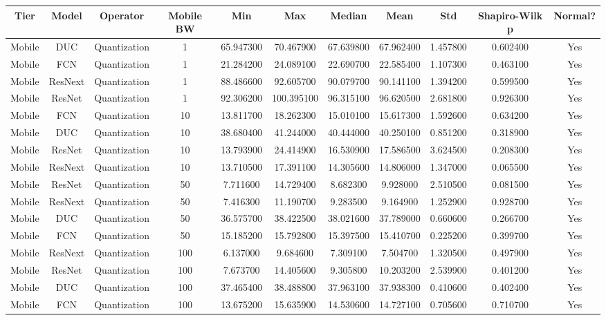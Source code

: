 \begin{tabular}{|c||c||c||c||c||c||c||c||c||c||c|}
\toprule
Tier & Model & Operator & Mobile BW & Min & Max & Median & Mean & Std & Shapiro-Wilk p & Normal? \\
\midrule
Mobile & DUC & Quantization & 1 & 65.947300 & 70.467900 & 67.639800 & 67.962400 & 1.457800 & 0.602400 & Yes \\
Mobile & FCN & Quantization & 1 & 21.284200 & 24.089100 & 22.690700 & 22.585400 & 1.107300 & 0.463100 & Yes \\
Mobile & ResNext & Quantization & 1 & 88.486600 & 92.605700 & 90.079700 & 90.141100 & 1.394200 & 0.599500 & Yes \\
Mobile & ResNet & Quantization & 1 & 92.306200 & 100.395100 & 96.315100 & 96.620500 & 2.681800 & 0.926300 & Yes \\
Mobile & FCN & Quantization & 10 & 13.811700 & 18.262300 & 15.010100 & 15.617300 & 1.592600 & 0.634200 & Yes \\
Mobile & DUC & Quantization & 10 & 38.680400 & 41.244000 & 40.444000 & 40.250100 & 0.851200 & 0.318900 & Yes \\
Mobile & ResNet & Quantization & 10 & 13.793900 & 24.414900 & 16.530900 & 17.586500 & 3.624500 & 0.208300 & Yes \\
Mobile & ResNext & Quantization & 10 & 13.710500 & 17.391100 & 14.305600 & 14.806000 & 1.347000 & 0.065500 & Yes \\
Mobile & ResNet & Quantization & 50 & 7.711600 & 14.729400 & 8.682300 & 9.928000 & 2.510500 & 0.081500 & Yes \\
Mobile & ResNext & Quantization & 50 & 7.416300 & 11.190700 & 9.283500 & 9.164900 & 1.252900 & 0.928700 & Yes \\
Mobile & DUC & Quantization & 50 & 36.575700 & 38.422500 & 38.021600 & 37.789000 & 0.660600 & 0.266700 & Yes \\
Mobile & FCN & Quantization & 50 & 15.185200 & 15.792800 & 15.397500 & 15.410700 & 0.225200 & 0.399700 & Yes \\
Mobile & ResNext & Quantization & 100 & 6.137000 & 9.684600 & 7.309100 & 7.504700 & 1.320500 & 0.497900 & Yes \\
Mobile & ResNet & Quantization & 100 & 7.673700 & 14.405600 & 9.305800 & 10.203200 & 2.539900 & 0.401200 & Yes \\
Mobile & DUC & Quantization & 100 & 37.465400 & 38.488800 & 37.963100 & 37.938300 & 0.410600 & 0.402400 & Yes \\
Mobile & FCN & Quantization & 100 & 13.675200 & 15.635900 & 14.530600 & 14.727100 & 0.705600 & 0.710700 & Yes \\

\end{tabular}

